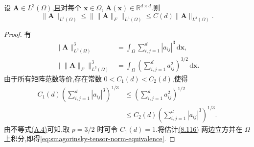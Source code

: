 \begin{lemma}[张量范数等价]
\label{lem:smagorinsky-tensor-norm-equivalence}
设 $\bm{A}\in L^3(\Omega)$,且对每个 $\bm{x}\in\Omega$,
$\bm{A}(\bm{x})\in\mathbb{R}^{d\times d}$.则
\begin{equation}\label{eq:smagorinsky-tensor-norm-equivalence}
 \|\bm{A}\|_{L^3(\Omega)}
 \le \bigl\|\|\bm{A}\|_F\bigr\|_{L^3(\Omega)}
 \le C(d)\|\bm{A}\|_{L^3(\Omega)}.
\end{equation}
\begin{proof}
有
\[
\begin{aligned}
 \|\bm{A}\|_{L^3(\Omega)}^3
  &=\int_\Omega\sum_{i,j=1}^d|a_{ij}|^3\,\mathrm{d}\bm{x},\\
 \bigl\|\|\bm{A}\|_F\bigr\|_{L^3(\Omega)}^3
  &=\int_\Omega\left(\sum_{i,j=1}^d a_{ij}^2\right)^{3/2}
       \,\mathrm{d}\bm{x}.
\end{aligned}
\]
由于所有矩阵范数等价,存在常数 $0<C_1(d)<C_2(d)$,使得
\begin{equation}\label{eq:smagorinsky-matrix-norm-equivalence}
\begin{aligned}
 C_1(d)\left(\sum_{i,j=1}^d|a_{ij}|^3\right)^{1/3}
 &\le \left(\sum_{i,j=1}^d a_{ij}^2\right)^{1/2}\\
 &\le C_2(d)\left(\sum_{i,j=1}^d|a_{ij}|^3\right)^{1/3}.
\end{aligned}
\end{equation}
由不等式\hyperref[eq:appendix-a-4]{(A.4)}可知,取 $p=3/2$ 时可令
$C_1(d)=1$.将估计\hyperref[eq:smagorinsky-matrix-norm-equivalence]{(8.116)}
两边立方并在 $\Omega$ 上积分,即得\cref{eq:smagorinsky-tensor-norm-equivalence}.
\end{proof}
\end{lemma}

